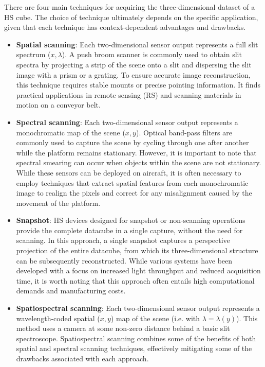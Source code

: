 There are four main techniques for acquiring the three-dimensional dataset of a HS cube.
The choice of technique ultimately depends on the specific application, given that each technique has context-dependent advantages and drawbacks.


\begin{itemize}
    \item \textbf{Spatial scanning}: Each two-dimensional sensor output represents a full slit spectrum ($x, \lambda$).
    A push broom scanner is commonly used to obtain slit spectra by projecting a strip of the scene onto a slit and dispersing the slit image with a prism or a grating.
    To ensure accurate image reconstruction, this technique requires stable mounts or precise pointing information.
    It finds practical applications in remote sensing (RS) and scanning materials in motion on a conveyor belt.
    
    \item \textbf{Spectral scanning}: Each two-dimensional sensor output represents a monochromatic map of the scene ($x, y$).
    Optical band-pass filters are commonly used to capture the scene by cycling through one after another while the platform remains stationary.
    However, it is important to note that spectral smearing can occur when objects within the scene are not stationary.
    While these sensors can be deployed on aircraft, it is often necessary to employ techniques that extract spatial features from each monochromatic image to realign the pixels and correct for any misalignment caused by the movement of the platform.
    
    \item \textbf{Snapshot}: HS devices designed for snapshot or non-scanning operations provide the complete datacube in a single capture, without the need for scanning.
    In this approach, a single snapshot captures a perspective projection of the entire datacube, from which its three-dimensional structure can be subsequently reconstructed.
    While various systems have been developed with a focus on increased light throughput and reduced acquisition time, it is worth noting that this approach often entails high computational demands and manufacturing costs.

    \item \textbf{Spatiospectral scanning}: Each two-dimensional sensor output represents a wavelength-coded spatial ($x, y$) map of the scene (i.e. with $\lambda = \lambda(y)$).
    This method uses a camera at some non-zero distance behind a basic slit spectroscope.
    Spatiospectral scanning combines some of the benefits of both spatial and spectral scanning techniques, effectively mitigating some of the drawbacks associated with each approach.
    
\end{itemize}

